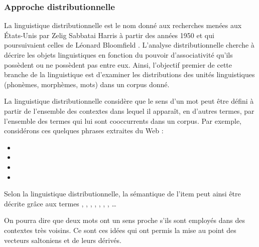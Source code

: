 \subsubsection{Approche distributionnelle}\label{sec:appr-distr}

La linguistique distributionnelle \cite{Harris1989} est le nom donné
aux recherches menées aux \'Etats-Unis par Zelig Sabbatai Harris
 à partir des années 1950 et qui poursuivaient celles
de Léonard Bloomfield . L'analyse
distributionnelle cherche à décrire les objets linguistiques en
fonction du pouvoir d'associativité qu'ils possèdent ou ne possèdent
pas entre eux.  Ainsi, l'objectif premier de cette branche de la
linguistique est d'examiner les distributions des unités linguistiques
(phonèmes, morphèmes, mots) dans un corpus donné.

La linguistique distributionnelle considère que le sens d'un mot peut
être défini à partir de l'ensemble des contextes dans lequel il
apparaît, en d'autres termes, par l'ensemble des termes qui lui sont
cooccurrents dans un corpus. Par exemple, considérons ces quelques
phrases extraites du Web :

\begin{center}
 \begin{itemize}
   
 \item {}
   
 \item {}
   
 \item {}
   
 \item {}
  \end{itemize}
\end{center}

Selon la linguistique distributionnelle, la sémantique de l'item
 peut ainsi être décrite grâce aux termes
, , ,
, , ,
, \ldots

On pourra dire que deux mots ont un sens proche s'ils sont employés
dans des contextes très voisins. Ce sont ces idées qui ont permis la
mise au point des vecteurs saltoniens et de leurs dérivés.


